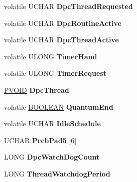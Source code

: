 \begin{DoxyCompactItemize}
volatile U\+C\+H\+AR {\bfseries Dpc\+Thread\+Requested}
\item 
\mbox{\label{struct___k_p_r_c_b_a28428747d9497d794da6072a43b7b10c}} 
volatile U\+C\+H\+AR {\bfseries Dpc\+Routine\+Active}
\item 
\mbox{\label{struct___k_p_r_c_b_a1f4df8586230c5b5d606706c3f3196e7}} 
volatile U\+C\+H\+AR {\bfseries Dpc\+Thread\+Active}
\item 
\mbox{\label{struct___k_p_r_c_b_aff892cc496a12d45974c37ea06dce8b4}} 
volatile U\+L\+O\+NG {\bfseries Timer\+Hand}
\item 
\mbox{\label{struct___k_p_r_c_b_ad0c16d978ab1c026f583e5101eeb9f8c}} 
volatile U\+L\+O\+NG {\bfseries Timer\+Request}
\item 
\mbox{\label{struct___k_p_r_c_b_acd7b264101177507191df4a0fbaf8308}} 
\hyperlink{interfacevoid}{P\+V\+O\+ID} {\bfseries Dpc\+Thread}
\item 
\mbox{\label{struct___k_p_r_c_b_a0f03df9d5ed90cf2ceda937065a43659}} 
volatile \hyperlink{_processor_bind_8h_a112e3146cb38b6ee95e64d85842e380a}{B\+O\+O\+L\+E\+AN} {\bfseries Quantum\+End}
\item 
\mbox{\label{struct___k_p_r_c_b_a30424a16bb07ee188949c059dc23cd56}} 
volatile U\+C\+H\+AR {\bfseries Idle\+Schedule}
\item 
\mbox{\label{struct___k_p_r_c_b_ada66120678d256436146b44b41b43abf}} 
U\+C\+H\+AR {\bfseries Prcb\+Pad5} \mbox{[}6\mbox{]}
\item 
\mbox{\label{struct___k_p_r_c_b_a7d80dfba473f9330b9dcae725d6ddc04}} 
L\+O\+NG {\bfseries Dpc\+Watch\+Dog\+Count}
\item 
\mbox{\label{struct___k_p_r_c_b_a2ba6590f1950a2265829d845f9ad5818}} 
L\+O\+NG {\bfseries Thread\+Watchdog\+Period}
\item 
\mbox{\label{struct___k_p_r_c_b_adb67e96a907ef3a98d903c1e48b3cd00}} 

\end{DoxyCompactItemize}
